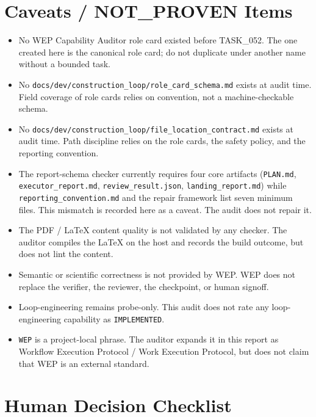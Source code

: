 \documentclass[11pt,a4paper]{article}
\begin{document}
\section{Caveats / NOT\_PROVEN Items}

\begin{itemize}[leftmargin=2em]
  \item No WEP Capability Auditor role card existed before TASK\_052.
        The one created here is the canonical role card; do not
        duplicate under another name without a bounded task.
  \item No \texttt{docs/dev/construction\_loop/role\_card\_schema.md}
        exists at audit time. Field coverage of role cards relies on
        convention, not a machine-checkable schema.
  \item No \texttt{docs/dev/construction\_loop/file\_location\_contract.md}
        exists at audit time. Path discipline relies on the role cards,
        the safety policy, and the reporting convention.
  \item The report-schema checker currently requires four core
        artifacts (\texttt{PLAN.md}, \texttt{executor\_report.md},
        \texttt{review\_result.json}, \texttt{landing\_report.md})
        while \texttt{reporting\_convention.md} and the repair
        framework list seven minimum files. This mismatch is recorded
        here as a caveat. The audit does not repair it.
  \item The PDF / LaTeX content quality is not validated by any
        checker. The auditor compiles the LaTeX on the host and
        records the build outcome, but does not lint the content.
  \item Semantic or scientific correctness is not provided by WEP.
        WEP does not replace the verifier, the reviewer, the
        checkpoint, or human signoff.
  \item Loop-engineering remains probe-only. This audit does not rate
        any loop-engineering capability as \texttt{IMPLEMENTED}.
  \item \texttt{WEP} is a project-local phrase. The auditor expands it
        in this report as Workflow Execution Protocol / Work Execution
        Protocol, but does not claim that WEP is an external standard.
\end{itemize}

\section{Human Decision Checklist}
\end{document}
